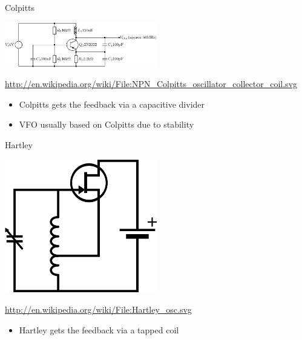 \documentclass{beamer}
\begin{document}
\begin{frame}{Colpitts}{}
\begin{centering}
\includegraphics[width=0.5\textwidth]{images/colpitts.png}

\tiny{\url{http://en.wikipedia.org/wiki/File:NPN_Colpitts_oscillator_collector_coil.svg}}
\end{centering}
\begin{itemize}
\item Colpitts gets the feedback via a capacitive divider

\item VFO usually based on Colpitts due to stability
\end{itemize}
\end{frame}

\begin{frame}{Hartley}{}
\begin{centering}
\includegraphics[width=0.5\textwidth]{images/hartley.png}

\tiny{\url{http://en.wikipedia.org/wiki/File:Hartley_osc.svg}}
\end{centering}
\begin{itemize}
\item Hartley gets the feedback via a tapped coil
\end{itemize}
\end{frame}
\end{document}
